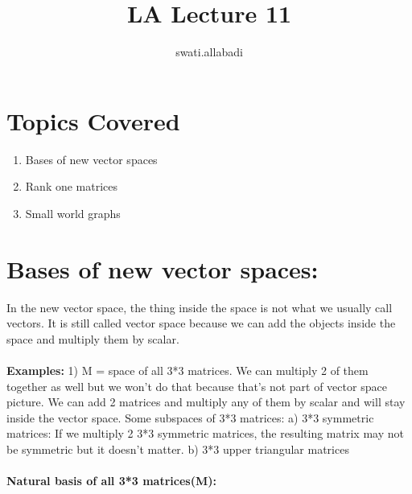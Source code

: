 \documentclass{article}
\title{LA Lecture 11}
\author{swati.allabadi }
\date{}
\begin{document}
\maketitle

\section{Topics Covered}

\begin{enumerate}
    \item Bases of new vector spaces
    \item Rank one matrices
    \item Small world graphs
\end{enumerate}

\section{Bases of new vector spaces:}
\newline
In the new vector space, the thing inside the space is not what we usually call vectors. It is still called vector space because we can add the objects inside the space and multiply them by scalar.
\\~\\
\textbf{Examples:} 1) M = space of all 3*3 matrices. We can multiply 2 of them together as well but we won't do that because that's not part of vector space picture. We can add 2 matrices and multiply any of them by scalar and will stay inside the vector space. 
\newline
Some subspaces of 3*3 matrices:
\newline
a) 3*3 symmetric matrices: If we multiply 2 3*3 symmetric matrices, the resulting matrix may not be symmetric but it doesn't matter.
\newline
b) 3*3 upper triangular matrices
\\~\\
\textbf{Natural basis of all 3*3 matrices(M):}
\end{document}

